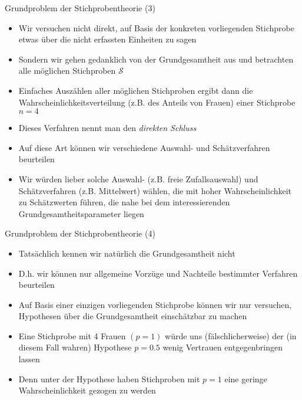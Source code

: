 \documentclass[9pt]{beamer}
\begin{document}
\begin{frame}{Grundproblem der Stichprobentheorie (3)}
\begin{itemize}
  \item Wir versuchen nicht direkt, auf Basis der konkreten vorliegenden Stichprobe etwas \"{u}ber die nicht erfassten Einheiten zu sagen
\item Sondern wir gehen gedanklich von der Grundgesamtheit aus und betrachten alle m\"{o}glichen Stichproben $\mathcal{S}$
\item Einfaches Ausz\"{a}hlen aller m\"{o}glichen Stichproben ergibt dann die Wahrscheinlichkeitsverteilung (z.B. des Anteils von Frauen) einer Stichprobe $n = 4$
\item Dieses Verfahren nennt man den \emph{direkten Schluss}
\item Auf diese Art k\"{o}nnen wir verschiedene Auswahl- und Sch\"{a}tzverfahren beurteilen
\item Wir w\"{u}rden lieber solche Auswahl- (z.B. freie Zufallsauswahl) und Sch\"{a}tzverfahren (z.B. Mittelwert) w\"{a}hlen, die mit hoher Wahrscheinlichkeit zu Sch\"{a}tzwerten f\"{u}hren, die nahe bei dem interessierenden Grundgesamtheitsparameter liegen
\end{itemize}
\end{frame}

\begin{frame}{Grundproblem der Stichprobentheorie (4)}
\begin{itemize}
\item Tats\"{a}chlich kennen wir nat\"{u}rlich die Grundgesamtheit nicht
\item D.h. wir k\"{o}nnen nur allgemeine Vorz\"{u}ge und Nachteile bestimmter Verfahren beurteilen
\item Auf Basis einer einzigen vorliegenden Stichprobe k\"{o}nnen wir nur versuchen, Hypothesen \"{u}ber die Grundgesamtheit einsch\"{a}tzbar zu machen
\item Eine Stichprobe mit 4 Frauen $(p = 1)$ w\"{u}rde uns (f\"{a}lschlicherweise) der (in diesem Fall wahren) Hypothese $p = 0.5$ wenig Vertrauen entgegenbringen lassen
\item Denn unter der Hypothese haben Stichproben mit $p = 1$ eine geringe Wahrscheinlichkeit gezogen zu werden
\end{itemize}
\end{frame}
\end{document}

